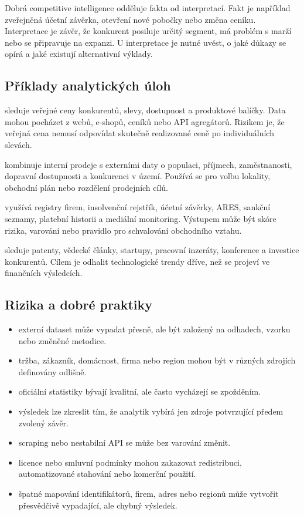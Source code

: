 Dobrá competitive intelligence odděluje fakta od interpretací. Fakt je například zveřejněná účetní
závěrka, otevření nové pobočky nebo změna ceníku. Interpretace je závěr, že konkurent posiluje určitý
segment, má problém s marží nebo se připravuje na expanzi. U interpretace je nutné uvést, o jaké
důkazy se opírá a jaké existují alternativní výklady.

\subsection{Příklady analytických úloh}
 sleduje veřejné ceny konkurentů, slevy, dostupnost a produktové balíčky.
Data mohou pocházet z webů, e-shopů, ceníků nebo API agregátorů. Rizikem je, že veřejná cena nemusí
odpovídat skutečně realizované ceně po individuálních slevách.

 kombinuje interní prodeje s externími daty o populaci, příjmech,
zaměstnanosti, dopravní dostupnosti a konkurenci v území. Používá se pro volbu lokality, obchodní
plán nebo rozdělení prodejních cílů.

 využívá registry firem, insolvenční rejstřík, účetní závěrky,
ARES, sankční seznamy, platební historii a mediální monitoring. Výstupem může být skóre rizika,
varování nebo pravidlo pro schvalování obchodního vztahu.

 sleduje patenty, vědecké články, startupy, pracovní inzeráty, konference
a investice konkurentů. Cílem je odhalit technologické trendy dříve, než se projeví ve finančních
výsledcích.

\subsection{Rizika a dobré praktiky}
\begin{itemize}
  \item {} externí dataset může vypadat přesně, ale být založený na odhadech,
  vzorku nebo změněné metodice.
  \item {} tržba, zákazník, domácnost, firma nebo region mohou být v různých
  zdrojích definovány odlišně.
  \item {} oficiální statistiky bývají kvalitní, ale často vycházejí se zpožděním.
  \item {} výsledek lze zkreslit tím, že analytik vybírá jen zdroje
  potvrzující předem zvolený závěr.
  \item {} scraping nebo nestabilní API se může bez varování změnit.
  \item {} licence nebo smluvní podmínky mohou zakazovat redistribuci, automatizované
  stahování nebo komerční použití.
  \item {} špatné mapování identifikátorů, firem, adres nebo regionů může
  vytvořit přesvědčivě vypadající, ale chybný výsledek.
\end{itemize}

